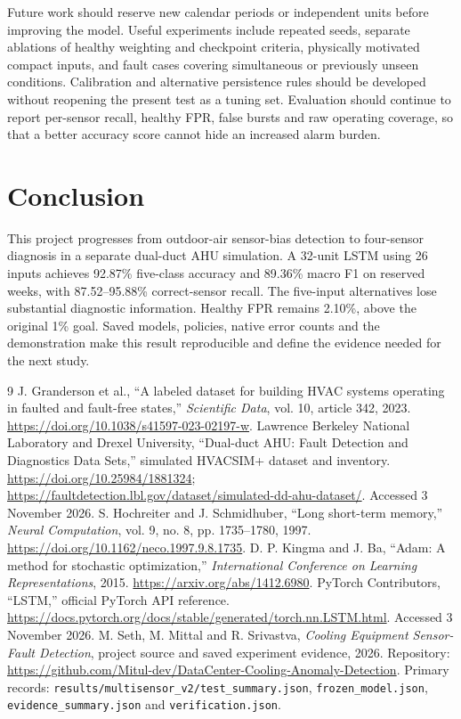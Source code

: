Future work should reserve new calendar periods or independent units before improving the model. Useful experiments include repeated seeds, separate ablations of healthy weighting and checkpoint criteria, physically motivated compact inputs, and fault cases covering simultaneous or previously unseen conditions. Calibration and alternative persistence rules should be developed without reopening the present test as a tuning set. Evaluation should continue to report per-sensor recall, healthy FPR, false bursts and raw operating coverage, so that a better accuracy score cannot hide an increased alarm burden.

\section{Conclusion}
This project progresses from outdoor-air sensor-bias detection to four-sensor diagnosis in a separate dual-duct AHU simulation. A 32-unit LSTM using 26 inputs achieves 92.87\% five-class accuracy and 89.36\% macro F1 on reserved weeks, with 87.52--95.88\% correct-sensor recall. The five-input alternatives lose substantial diagnostic information. Healthy FPR remains 2.10\%, above the original 1\% goal. Saved models, policies, native error counts and the demonstration make this result reproducible and define the evidence needed for the next study.

\clearpage
{}
\begin{thebibliography}{9}
 J. Granderson et al., ``A labeled dataset for building HVAC systems operating in faulted and fault-free states,'' \emph{Scientific Data}, vol. 10, article 342, 2023. \url{https://doi.org/10.1038/s41597-023-02197-w}.
 Lawrence Berkeley National Laboratory and Drexel University, ``Dual-duct AHU: Fault Detection and Diagnostics Data Sets,'' simulated HVACSIM+ dataset and inventory. \url{https://doi.org/10.25984/1881324}; \url{https://faultdetection.lbl.gov/dataset/simulated-dd-ahu-dataset/}. Accessed 3 November 2026.
 S. Hochreiter and J. Schmidhuber, ``Long short-term memory,'' \emph{Neural Computation}, vol. 9, no. 8, pp. 1735--1780, 1997. \url{https://doi.org/10.1162/neco.1997.9.8.1735}.
 D. P. Kingma and J. Ba, ``Adam: A method for stochastic optimization,'' \emph{International Conference on Learning Representations}, 2015. \url{https://arxiv.org/abs/1412.6980}.
 PyTorch Contributors, ``LSTM,'' official PyTorch API reference. \url{https://docs.pytorch.org/docs/stable/generated/torch.nn.LSTM.html}. Accessed 3 November 2026.
 M. Seth, M. Mittal and R. Srivastva, \emph{Cooling Equipment Sensor-Fault Detection}, project source and saved experiment evidence, 2026. Repository: \url{https://github.com/Mitul-dev/DataCenter-Cooling-Anomaly-Detection}. Primary records: \texttt{results/multisensor\_v2/test\_summary.json}, \texttt{frozen\_model.json}, \texttt{evidence\_summary.json} and \texttt{verification.json}.
\end{thebibliography}


